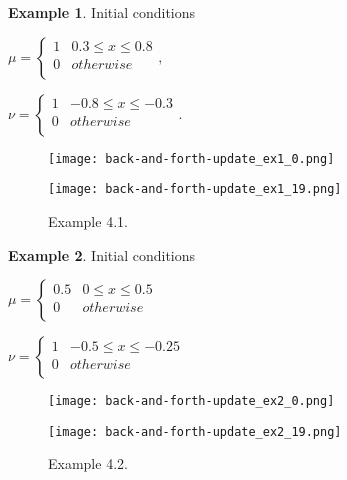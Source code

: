 \documentclass[a4j,10pt, twocolumn, dvipdfmx]{article}
\theoremstyle{definition}
\newtheorem{ex}{Example}[section]
\begin{document}
\begin{ex}
    Initial conditions

    $\mu = \left\{
        \begin{array}{ll}
            1 & 0.3 \le x \le 0.8\\
            0 & otherwise \\
        \end{array},
    \right.
    $

    $\nu = \left\{
        \begin{array}{ll}
            1 & - 0.8 \le x \le - 0.3 \\
            0 & otherwise \\
        \end{array}.
    \right.
    $


\end{ex}
\begin{figure}[htb]
    \begin{center}
        \begin{minipage}{0.45\hsize}
            \texttt{[image: back-and-forth-update\_ex1\_0.png]}
        \end{minipage}
        \begin{minipage}{0.45\hsize}
            \texttt{[image: back-and-forth-update\_ex1\_19.png]}
        \end{minipage}
    \end{center}
    \caption{Example 4.1.}
\end{figure}
\label{Example 1}

\begin{ex}
    Initial conditions

    $\mu = \left\{
        \begin{array}{ll}
            0.5 & 0 \le x \le 0.5 \\
            0 & otherwise \\
        \end{array}
    \right.
    $

    $\nu = \left\{
        \begin{array}{ll}
            1 & - 0.5 \le x \le - 0.25 \\
            0 & otherwise \\
        \end{array}
    \right.
    $

    \begin{figure}[htb]
        \begin{center}
            \begin{minipage}{0.45\hsize}
                \texttt{[image: back-and-forth-update\_ex2\_0.png]}
            \end{minipage}
            \begin{minipage}{0.45\hsize}
                \texttt{[image: back-and-forth-update\_ex2\_19.png]}
            \end{minipage}
        \end{center}
        \caption{Example 4.2.}
    \end{figure}

\end{ex}
\end{document}
